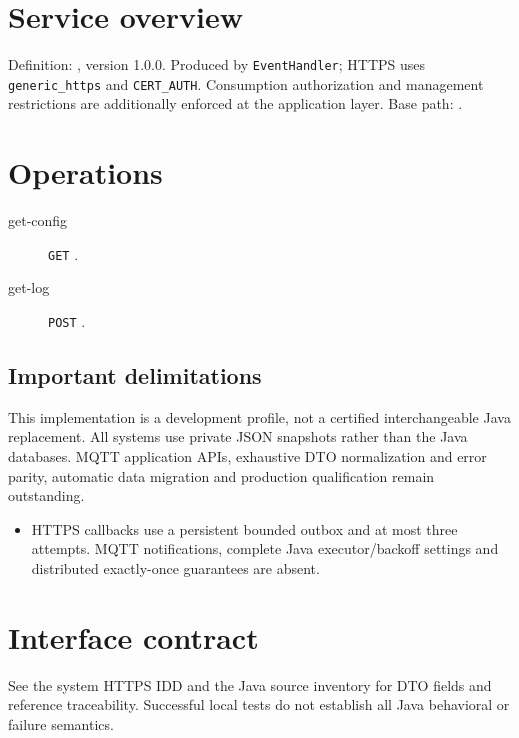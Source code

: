 \documentclass[a4paper]{arrowhead}
\begin{document}
\ArrowheadSetup
\section{Service overview}
Definition: , version 1.0.0. Produced by \texttt{EventHandler}; HTTPS uses \texttt{generic\_https} and \texttt{CERT\_AUTH}. Consumption authorization and management restrictions are additionally enforced at the application layer. Base path: .
\section{Operations}
\begin{description}
\item[get-config] \texttt{GET} .
\item[get-log] \texttt{POST} .
\end{description}
\subsection{Important delimitations}
This implementation is a development profile, not a certified interchangeable Java replacement. All systems use private JSON snapshots rather than the Java databases. MQTT application APIs, exhaustive DTO normalization and error parity, automatic data migration and production qualification remain outstanding.
\begin{itemize}
\item HTTPS callbacks use a persistent bounded outbox and at most three attempts. MQTT notifications, complete Java executor/backoff settings and distributed exactly-once guarantees are absent.
\end{itemize}
\section{Interface contract}
See the system HTTPS IDD and the Java source inventory for DTO fields and reference traceability. Successful local tests do not establish all Java behavioral or failure semantics.
\end{document}
